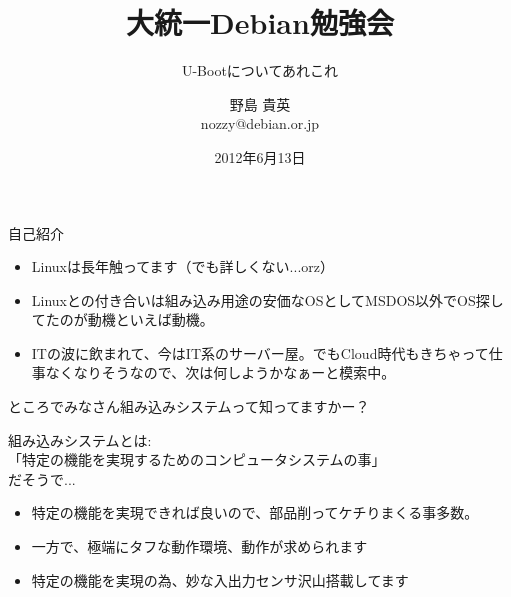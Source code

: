 \title{大統一Debian勉強会}
\subtitle{U-Bootについてあれこれ}
\author{野島 貴英\\nozzy@debian.or.jp}
\date{2012年6月13日}



\frame{\titlepage{}}

\begin{frame}{自己紹介}

\begin{itemize}
\item Linuxは長年触ってます（でも詳しくない...orz）
\item Linuxとの付き合いは組み込み用途の安価なOSとしてMSDOS以外でOS探してたのが動機といえば動機。
\item ITの波に飲まれて、今はIT系のサーバー屋。でもCloud時代もきちゃって仕事なくなりそうなので、次は何しようかなぁーと模索中。
\end{itemize}

\end{frame}

\begin{frame}{ところでみなさん組み込みシステムって知ってますかー？}

組み込みシステムとは:\\
「特定の機能を実現するためのコンピュータシステムの事」\\
だそうで...
\begin {itemize}
\item 特定の機能を実現できれば良いので、部品削ってケチりまくる事多数。
\item 一方で、極端にタフな動作環境、動作が求められます
\item 特定の機能を実現の為、妙な入出力センサ沢山搭載してます
\end{itemize}

\end{frame}

